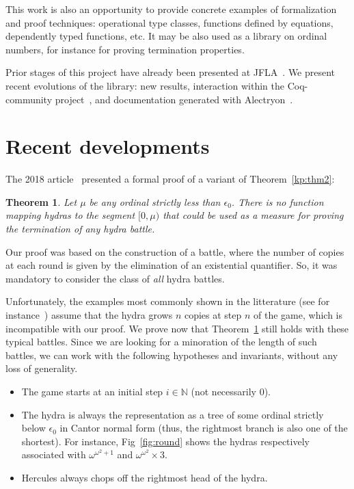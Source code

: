 \documentclass{easychair}
\newtheorem{theorem}{Theorem}
\newcommand{\community}{Coq-community\xspace}
\newcommand{\alectr}{Alectryon\xspace}
\begin{document}
This work is also an opportunity to 
 provide concrete examples of formalization and proof techniques: operational type classes, functions defined by  equations, dependently typed functions, etc. It may be also used as a library on ordinal numbers, for instance for proving termination properties.

 Prior stages of this project have already been presented at
 JFLA~\cite{PCiota, JFLA2018paper}.
We present recent evolutions of the library: new results, interaction within the \community project~\cite{CoqCommunity}, and documentation generated with \alectr~\cite{alectryonpaper, alectryongithub}.

\section{Recent developments}
The 2018 article~\cite{JFLA2018paper} presented a formal proof of  a variant of Theorem~\ref{kp:thm2}:

\begin{theorem}
  Let $\mu$ be any ordinal strictly less than $\epsilon_0$.
  There is no function mapping hydras to the segment $[0,\mu)$ that could be used as a measure for  proving the termination of  \emph{any} hydra battle.\label{thm3}
\end{theorem}

Our proof was based on the construction of a battle, where the
number of copies at each round is given by the elimination of an existential quantifier. So, it was mandatory to consider the class of \emph{all} hydra battles.

Unfortunately, the examples  most commonly shown in the litterature
(see for instance~\cite{KP82, bauer2008, BauerHydra}) 
assume that the hydra grows $n$ copies at step $n$ of the game, which is incompatible with our proof.
We prove now that Theorem~\ref{thm3} still holds with these typical battles.
Since we are looking  for a minoration of the length of such battles,
we can work with the following hypotheses and invariants, 
without any loss of generality.
 
 \begin{itemize}
   \item The game starts at an initial step $i\in\mathbb{N}$ (not necessarily $0$).
   \item  The hydra is always the  representation as a tree of some ordinal strictly below $\epsilon_0$ in Cantor normal
     form (thus, the rightmost branch is also one of the shortest).
     For instance, Fig~\ref{fig:round} shows the hydras respectively associated with  $\omega^{\omega^2+1}$ and $\omega^{\omega^2}\times 3$. 
 
 \item Hercules always chops off the rightmost head of the hydra.
 \end{itemize}
 
\end{document}

